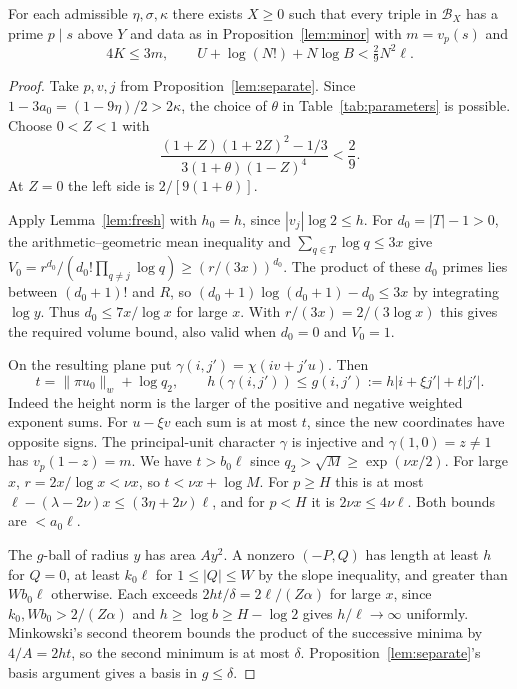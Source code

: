 \begin{lemma}\label{lem:diamond}
For each admissible $\eta,\sigma,\kappa$ there exists $X\ge0$ such that
every triple in $\mathcal B_X$ has a prime $p\mid s$ above $Y$ and data
as in Proposition~\ref{lem:minor} with $m=v_p(s)$ and
\begin{equation}\label{eq:budget}
           4K\le3m,\qquad U+\log(N!)+N\log B<\tfrac29 N^2\ell .
\end{equation}
\end{lemma}
\begin{proof}
Take $p,v,j$ from Proposition~\ref{lem:separate}. Since
$1-3a_0=(1-9\eta)/2>2\kappa$, the choice of $\theta$ in
Table~\ref{tab:parameters} is possible. Choose $0<Z<1$ with
\begin{equation}\label{eq:slack}
 \frac{(1+Z)(1+2Z)^2-1/3}{3(1+\theta)(1-Z)^4}<\frac29 .
\end{equation}
At $Z=0$ the left side is $2/[9(1+\theta)]$.

Apply Lemma~\ref{lem:fresh} with $h_0=h$, since $|v_j|\log 2\le h$.
For $d_0=|T|-1>0$, the arithmetic--geometric mean inequality and
$\sum_{q\in T}\log q\le3x$ give
$V_0=r^{d_0}/(d_0!\prod_{q\ne j}\log q)\ge(r/(3x))^{d_0}$.
The product of these $d_0$ primes lies between $(d_0+1)!$ and $R$, so
$(d_0+1)\log(d_0+1)-d_0\le3x$ by integrating $\log y$.
Thus $d_0\le7x/\log x$ for large $x$. With $r/(3x)=2/(3\log x)$
this gives the required volume bound, also valid when $d_0=0$ and $V_0=1$.

On the resulting plane put $\gamma(i,j')=\chi(iv+j'u)$. Then
\begin{equation}\label{eq:plane-height}
 t=\|\pi u_0\|_w+\log q_2,\qquad
 h(\gamma(i,j'))\le g(i,j'):=h|i+\xi j'|+t|j'|.
\end{equation}
Indeed the height norm is the larger of the positive and negative
weighted exponent sums. For $u-\xi v$ each sum is at most $t$, since
the new coordinates have opposite signs. The principal-unit character
$\gamma$ is injective and $\gamma(1,0)=z\ne1$ has $v_p(1-z)=m$.
We have $t>b_0\ell$ since $q_2>\sqrt M\ge\exp(\nu x/2)$.
For large $x$, $r=2x/\log x<\nu x$, so $t<\nu x+\log M$. For $p\ge H$ this is at most
$\ell-(\lambda-2\nu)x\le(3\eta+2\nu)\ell$, and for $p<H$ it is
$2\nu x\le4\nu\ell$. Both bounds are $<a_0\ell$.

The $g$-ball of radius $y$ has area $Ay^2$. A nonzero $(-P,Q)$ has
length at least $h$ for $Q=0$, at least $k_0\ell$ for $1\le|Q|\le W$
by the slope inequality, and greater than $Wb_0\ell$ otherwise.
Each exceeds $2ht/\delta=2\ell/(Z\alpha)$ for large $x$, since
$k_0,Wb_0>2/(Z\alpha)$ and $h\ge\log b\ge H-\log2$ gives $h/\ell\to\infty$ uniformly.
Minkowski's second theorem bounds the product of the successive minima
by $4/A=2ht$, so the second minimum is at most $\delta$.
Proposition~\ref{lem:separate}'s basis argument gives a basis in $g\le\delta$.


\end{proof}
